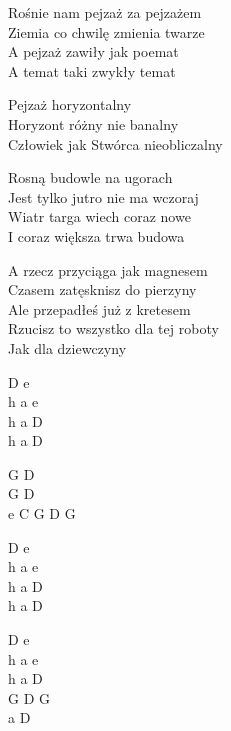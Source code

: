 \begin{text}
    Rośnie nam pejzaż za pejzażem\\
    Ziemia co chwilę zmienia twarze\\
    A pejzaż zawiły jak poemat\\
    A temat taki zwykły temat

    \vin Pejzaż horyzontalny\\
    \vin Horyzont różny nie banalny\\
    \vin Człowiek jak Stwórca nieobliczalny

    Rosną budowle na ugorach\\
    Jest tylko jutro nie ma wczoraj\\
    Wiatr targa wiech coraz nowe\\
    I coraz większa trwa budowa

    A rzecz przyciąga jak magnesem\\
    Czasem zatęsknisz do pierzyny\\
    Ale przepadłeś już z kretesem\\
    Rzucisz to wszystko dla tej roboty\\
    Jak dla dziewczyny
\end{text}
\begin{chord}
    D e\\
    h a e\\
    h a D\\
    h a D

    G D\\
    G D\\
    e C G D G

    D e\\
    h a e\\
    h a D\\
    h a D

    D e\\
    h a e\\
    h a D\\
    G D G\\
    a D
\end{chord}